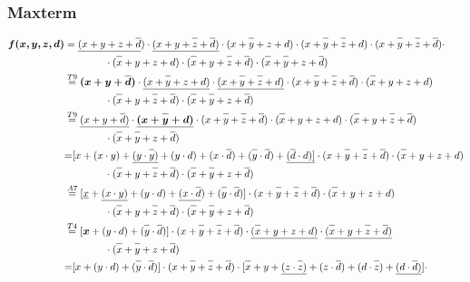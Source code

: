 \documentclass{article}
\newcommand*{\oline}[1]{\overline{#1\mathstrut}}
\newcommand{\bigspace}{\quad\quad\quad\quad}
\begin{document}
	\subsubsection*{Maxterm}
\begin{align*}
\bm{f(x,y,z,d)} &= \underline{(x+y+z+\oline{d}}) \cdot  \underline{(x+y+\oline{z}+\oline{d})} \cdot (x+\oline{y}+z+d) \cdot (x+\oline{y}+\oline{z}+d) \cdot (x+\oline{y}+\oline{z}+ \oline{d}) \cdot \\
&\bigspace \cdot (\oline{x}+y+z+d) \cdot (\oline{x}+y+\oline{z}+\oline{d}) \cdot (\oline{x}+\oline{y}+z+\oline{d})\\
&\overset{T9}{=} \bm{(x+y+\oline{d})} \cdot \underline{(x+\oline{y}+z+d)} \cdot \underline{(x+\oline{y}+\oline{z}+d)} \cdot (x+\oline{y}+\oline{z}+\oline{d})\cdot (\oline{x}+y+z+d) \\
&\bigspace  \cdot (\oline{x}+y+\oline{z}+\oline{d}) \cdot (\oline{x}+\oline{y}+z+\oline{d})\\
&\overset{T9}{=} \underline{(x+y+\oline{d})} \cdot \bm{\underline{(x+\oline{y}+d)}}\cdot (x+\oline{y}+\oline{z}+\oline{d})\cdot (\oline{x}+y+z+d) \cdot (\oline{x}+y+\oline{z}+\oline{d}) \\
&\bigspace   \cdot (\oline{x}+\oline{y}+z+\oline{d})\\
&{=} [x + (x \cdot y) + \underline{(y \cdot \oline{y})} + (y \cdot d)+ (x \cdot \oline{d}) + (\oline{y} \cdot \oline{d}) + \underline{(\oline{d} \cdot d) ]} \cdot (x+\oline{y}+\oline{z}+\oline{d})\cdot (\oline{x}+y+z+d)  \\
&\bigspace  \cdot (\oline{x}+y+\oline{z}+\oline{d})  \cdot (\oline{x}+\oline{y}+z+\oline{d})\\
&\overset{A7}{=} [\underline{x} + \underline{(x \cdot y)} +  (y \cdot d)+ \underline{(x \cdot \oline{d}}) + (\oline{y} \cdot \oline{d})] \cdot (x+\oline{y}+\oline{z}+\oline{d})\cdot (\oline{x}+y+z+d)  \\
&\bigspace  \cdot (\oline{x}+y+\oline{z}+\oline{d})  \cdot (\oline{x}+\oline{y}+z+\oline{d})\\
&\overset{T4}{=}[\bm{x} +  (y \cdot d)+  (\oline{y} \cdot \oline{d})] \cdot (x+\oline{y}+\oline{z}+\oline{d})\cdot \underline{(\oline{x}+y+z+d)} \cdot \underline{(\oline{x}+y+\oline{z}+\oline{d})}  \\
&\bigspace   \cdot (\oline{x}+\oline{y}+z+\oline{d})\\
&{=} [x +  (y \cdot d)+  (\oline{y} \cdot \oline{d})] \cdot (x+\oline{y}+\oline{z}+\oline{d})\cdot [\oline{x}+y+\underline{(z \cdot \oline{z})}+(z \cdot \oline{d})+ (d \cdot \oline{z})  + \underline{(d \cdot \oline{d})}] \cdot \\

\end{align*}
\end{document}
